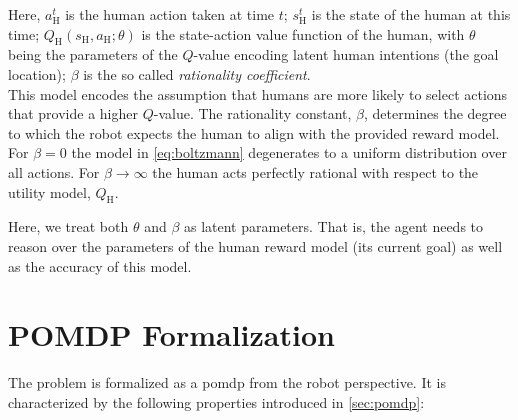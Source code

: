 Here, $a^t_\text{H}$ is the human action taken at time $t$; $s^t_\text{H}$ is
the state of the human at this time; $Q_\text{H}(s_\text{H}, a_\text{H}; \theta)$ is the
state-action value function of the human, with $\theta$ being the parameters of the
$Q$-value encoding latent human intentions (\eg the goal location); $\beta$ is
the so called \emph{rationality coefficient}.\\
This model encodes the assumption that humans are more likely to select actions that
provide a higher $Q$-value. The rationality constant, $\beta$, determines the
degree to which the robot expects the human to align with the provided reward
model. For $\beta = 0$ the model in \cref{eq:boltzmann} degenerates to
a uniform distribution over all actions. For $\beta \to \infty$ the human acts
perfectly rational with respect to the utility model,
$Q_\text{H}$.

Here, we treat both $\theta$ and $\beta$ as latent parameters. That is, the
agent needs to reason over the parameters of the human reward model (\eg its
current goal) as well as the accuracy of this model.

\section{POMDP Formalization}\label{sec:hri-pomdp-formalization}

The problem is formalized as a \ac{pomdp} from the robot perspective. It is
characterized by the following properties introduced in \cref{sec:pomdp}:

